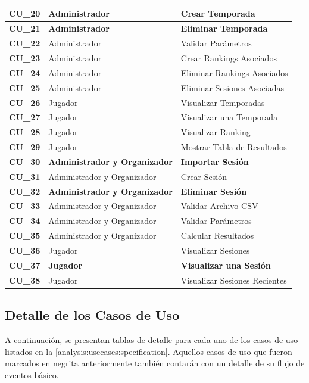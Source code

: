 \begin{center}
\begin{tabular}{| p{1.5cm} | p{6.5cm} | p{5.5cm} |}
    {\textbf{CU\_20}} & \textbf{Administrador} & \textbf{Crear Temporada}\\ \hline
    {\textbf{CU\_21}} & \textbf{Administrador} & \textbf{Eliminar Temporada}\\ \hline
    {\textbf{CU\_22}} & Administrador & Validar Parámetros\\\hline
    {\textbf{CU\_23}} & Administrador & Crear Rankings Asociados\\ \hline
    {\textbf{CU\_24}} & Administrador & Eliminar Rankings Asociados\\ \hline
    {\textbf{CU\_25}} & Administrador & Eliminar Sesiones Asociadas\\ \hline
    
    {\textbf{CU\_26}} & Jugador & Visualizar Temporadas\\ \hline
    {\textbf{CU\_27}} & Jugador & Visualizar una Temporada\\ \hline
    {\textbf{CU\_28}} & Jugador & Visualizar Ranking\\ \hline
    {\textbf{CU\_29}} & Jugador & Mostrar Tabla de Resultados\\ \hline
    
    {\textbf{CU\_30}} & \textbf{Administrador y Organizador} & \textbf{Importar Sesión}\\ \hline
    {\textbf{CU\_31}} & Administrador y Organizador & Crear Sesión\\ \hline
    {\textbf{CU\_32}} & \textbf{Administrador y Organizador} & \textbf{Eliminar Sesión}\\ \hline
    {\textbf{CU\_33}} & Administrador y Organizador & Validar Archivo CSV\\ \hline
    {\textbf{CU\_34}} & Administrador y Organizador & Validar Parámetros\\ \hline
    {\textbf{CU\_35}} & Administrador y Organizador & Calcular Resultados\\ \hline
    
    {\textbf{CU\_36}} & Jugador & Visualizar Sesiones\\ \hline
    {\textbf{CU\_37}} & \textbf{Jugador} & \textbf{Visualizar una Sesión}\\ \hline
    {\textbf{CU\_38}} & Jugador & Visualizar Sesiones Recientes\\ \hline
  \end{tabular}
\end{center}

\subsection{Detalle de los Casos de Uso}
A continuación, se presentan tablas de detalle para cada uno de los casos de uso listados en la \autoref{analysis:usecases:specification}. Aquellos casos de uso que fueron marcados en negrita anteriormente también contarán con un detalle de su flujo de eventos básico.

